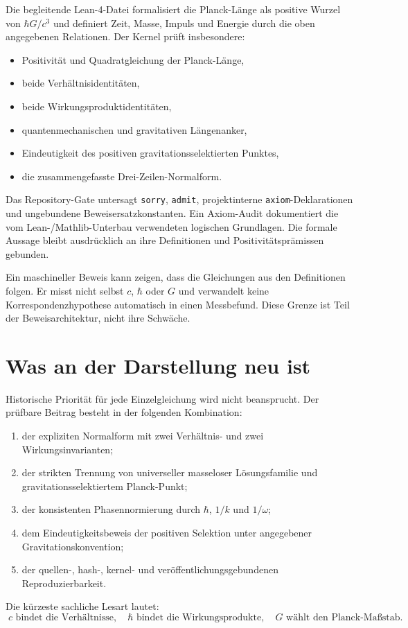 \documentclass[11pt,a4paper]{article}
\begin{document}
Die begleitende Lean-4-Datei formalisiert die Planck-Länge als positive Wurzel
von $\hbar G/c^3$ und definiert Zeit, Masse, Impuls und Energie durch die oben
angegebenen Relationen. Der Kernel prüft insbesondere:
\begin{itemize}
 \item Positivität und Quadratgleichung der Planck-Länge,
 \item beide Verhältnisidentitäten,
 \item beide Wirkungsproduktidentitäten,
 \item quantenmechanischen und gravitativen Längenanker,
 \item Eindeutigkeit des positiven gravitationsselektierten Punktes,
 \item die zusammengefasste Drei-Zeilen-Normalform.
\end{itemize}
Das Repository-Gate untersagt \texttt{sorry}, \texttt{admit}, projektinterne
\texttt{axiom}-Deklarationen und ungebundene Beweisersatzkonstanten. Ein
Axiom-Audit dokumentiert die vom Lean-/Mathlib-Unterbau verwendeten logischen
Grundlagen. Die formale Aussage bleibt ausdrücklich an ihre Definitionen und
Positivitätsprämissen gebunden.

Ein maschineller Beweis kann zeigen, dass die Gleichungen aus den Definitionen
folgen. Er misst nicht selbst $c$, $\hbar$ oder $G$ und verwandelt keine
Korrespondenzhypothese automatisch in einen Messbefund. Diese Grenze ist Teil
der Beweisarchitektur, nicht ihre Schwäche.

\section{Was an der Darstellung neu ist}

Historische Priorität für jede Einzelgleichung wird nicht beansprucht. Der
prüfbare Beitrag besteht in der folgenden Kombination:
\begin{enumerate}
 \item der expliziten Normalform mit zwei Verhältnis- und zwei
       Wirkungsinvarianten;
 \item der strikten Trennung von universeller masseloser Lösungsfamilie und
       gravitationsselektiertem Planck-Punkt;
 \item der konsistenten Phasennormierung durch $\hbar$, $1/k$ und $1/\omega$;
 \item dem Eindeutigkeitsbeweis der positiven Selektion unter angegebener
       Gravitationskonvention;
 \item der quellen-, hash-, kernel- und veröffentlichungsgebundenen
       Reproduzierbarkeit.
\end{enumerate}
Die kürzeste sachliche Lesart lautet:
\[
 \boxed{\;c\text{ bindet die Verhältnisse},\quad
        \hbar\text{ bindet die Wirkungsprodukte},\quad
        G\text{ wählt den Planck-Maßstab.}\;}
\]
\end{document}

